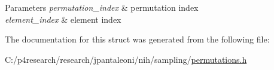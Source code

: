 \begin{DoxyParams}{\-Parameters}
{\em permutation\-\_\-index} & permutation index \\
\hline
{\em element\-\_\-index} & element index \\
\hline
\end{DoxyParams}


\-The documentation for this struct was generated from the following file\-:\begin{DoxyCompactItemize}
\item 
\-C\-:/p4research/research/jpantaleoni/nih/sampling/\hyperlink{permutations_8h}{permutations.\-h}\end{DoxyCompactItemize}
